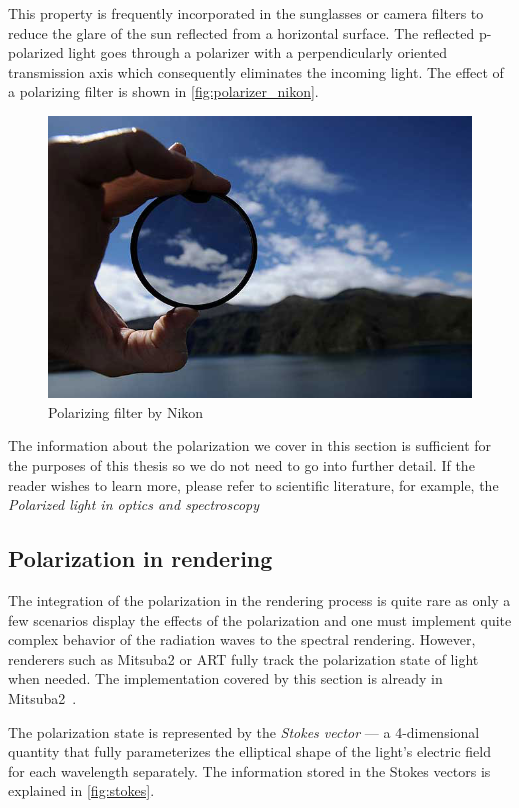 This property is frequently incorporated in the sunglasses or camera filters to reduce the glare of the sun reflected from a horizontal surface. The reflected p-polarized light goes through a polarizer with a perpendicularly oriented transmission axis which consequently eliminates the incoming light. The effect of a polarizing filter is shown in \autoref{fig:polarizer_nikon}.

\begin{figure}[h]
	\centering
	\includegraphics[width=.7\linewidth]{img/polarizer_nikon.jpg}
	\caption[nikon]{Polarizing filter by Nikon\footnotemark}
	\label{fig:polarizer_nikon}
\end{figure}

The information about the polarization we cover in this section is sufficient for the purposes of this thesis so we do not need to go into further detail. If the reader wishes to learn more, please refer to scientific literature, for example, the \emph{Polarized light in optics and spectroscopy}~\cite{kliger2012polarized}

\subsection{Polarization in rendering}
The integration of the polarization in the rendering process is quite rare as only a few scenarios display the effects of the polarization and one must implement quite complex behavior of the radiation waves to the spectral rendering. However, renderers such as Mitsuba2 or ART fully track the polarization state of light when needed. The implementation covered by this section is already in Mitsuba2~\cite{mitsubaWeb}.

The polarization state is represented by the \emph{Stokes vector} --- a 4-dimensional quantity that fully parameterizes the elliptical shape of the light's electric field for each wavelength separately. The information stored in the Stokes vectors is explained in \autoref{fig:stokes}.


